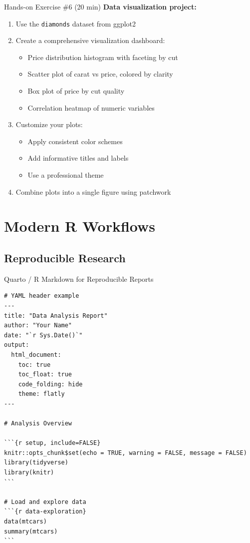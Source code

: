 \documentclass[aspectratio=169]{beamer}
\begin{document}
\begin{frame}{Hands-on Exercise \#6 (20 min)}
  \textbf{Data visualization project:}
  \begin{enumerate}
    \item Use the \texttt{diamonds} dataset from ggplot2
    \item Create a comprehensive visualization dashboard:
      \begin{itemize}
        \item Price distribution histogram with faceting by cut
        \item Scatter plot of carat vs price, colored by clarity
        \item Box plot of price by cut quality
        \item Correlation heatmap of numeric variables
      \end{itemize}
    \item Customize your plots:
      \begin{itemize}
        \item Apply consistent color schemes
        \item Add informative titles and labels
        \item Use a professional theme
      \end{itemize}
    \item Combine plots into a single figure using patchwork
  \end{enumerate}
\end{frame}

\section{Modern R Workflows}

\subsection{Reproducible Research}

\begin{frame}[fragile]{Quarto / R Markdown for Reproducible Reports}
\begin{lstlisting}
# YAML header example
---
title: "Data Analysis Report"
author: "Your Name"
date: "`r Sys.Date()`"
output:
  html_document:
    toc: true
    toc_float: true
    code_folding: hide
    theme: flatly
---

# Analysis Overview

```{r setup, include=FALSE}
knitr::opts_chunk$set(echo = TRUE, warning = FALSE, message = FALSE)
library(tidyverse)
library(knitr)
```

# Load and explore data
```{r data-exploration}
data(mtcars)
summary(mtcars)
```
\end{lstlisting}
\end{frame}
\end{document}
